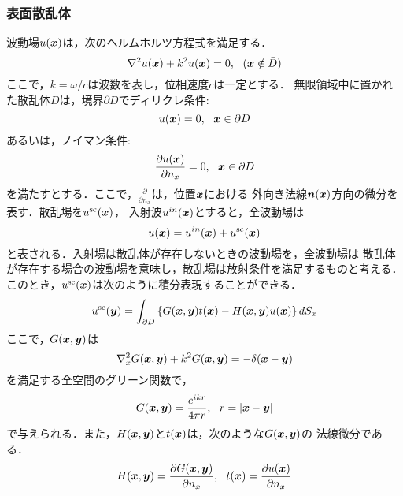 \subsubsection{表面散乱体}
波動場$u(\mbox{\boldmath $x$})$は，次のヘルムホルツ方程式を満足する．
\begin{equation}
	\nabla^2 u(\fat{x}) + k^2 u(\fat{x}) =0, \ \ (\fat{x} \notin \bar{D})
	\label{eqn:ZZZ_00}
\end{equation}
ここで，$k=\omega/c$は波数を表し，位相速度$c$は一定とする．
無限領域中に置かれた散乱体$D$は，境界$\partial D$でディリクレ条件: 
\begin{equation}
	u(\mbox{\boldmath $x$}) = 0, \ \ \mbox{\boldmath $x$}\in \partial D
	\label{eqn:ZZZ_01}
\end{equation}
あるいは，ノイマン条件:
\begin{equation}
	\frac{\partial u(\fat{x})}{\partial n_x} = 0 ,\ \ \fat{x}\in \partial D
	\label{eqn:ZZZ_02}
\end{equation}
を満たすとする．ここで，$\frac{\partial }{\partial n_x}$は，位置$\mbox{\boldmath $x$}$における
外向き法線$\mbox{\boldmath $n$}(\mbox{\boldmath $x$})$方向の微分を表す．散乱場を$u^{\rm sc}(\mbox{\boldmath $x$})$，
入射波$u^{in}(\mbox{\boldmath $x$})$とすると，全波動場は
\begin{equation}
	u(\mbox{\boldmath $x$})=u^{in}(\mbox{\boldmath $x$})+ u^{\rm sc}(\mbox{\boldmath $x$})
	\label{eqn:ZZZ_03}
\end{equation}
と表される．入射場は散乱体が存在しないときの波動場を，全波動場は
散乱体が存在する場合の波動場を意味し，散乱場は放射条件を満足するものと考える．
このとき，$u^{\rm sc}(\mbox{\boldmath $x$})$は次のように積分表現することができる．
\begin{equation}
	u^{\rm sc}(\mbox{\boldmath $y$}) = \int _{\partial D} 
	\left\{
		G(\mbox{\boldmath $x$},\mbox{\boldmath $y$})t(\mbox{\boldmath $x$})
	-
		H(\mbox{\boldmath $x$},\mbox{\boldmath $y$})u(\mbox{\boldmath $x$})
	\right\} dS_x
	\label{eqn:ZZZ_04}
\end{equation}
ここで，$G(\mbox{\boldmath $x$},\mbox{\boldmath $y$})$は
\begin{equation}
	\nabla_x^2 G(\mbox{\boldmath $x$},\mbox{\boldmath $y$}) + k^2 G(\mbox{\boldmath $x$},\mbox{\boldmath $y$}) =-\delta (\mbox{\boldmath $x$}-\mbox{\boldmath $y$} )
	\label{eqn:ZZZ_05}
\end{equation}
を満足する全空間のグリーン関数で，
\begin{equation}
	G(\fat{x},\fat{y}) =\frac{e^{ikr}}{4\pi r}, \ \ r=\left| \fat{x}-\fat{y} \right|
	\label{eqn:ZZZ_Green}
\end{equation}
で与えられる．また，$H(\mbox{\boldmath $x$},\mbox{\boldmath $y$})$と$t(\mbox{\boldmath $x$})$は，次のような$G(\mbox{\boldmath $x$},\mbox{\boldmath $y$})$の
法線微分である．
\begin{equation}
	H(\fat{x},\fat{y}) = \frac{\partial G(\fat{x},\fat{y})}{\partial n_x}, \ \ 
	t(\fat{x}) =\frac{\partial u(\fat{x})}{\partial n_x}
	\label{eqn:ZZZ_06}
\end{equation}

